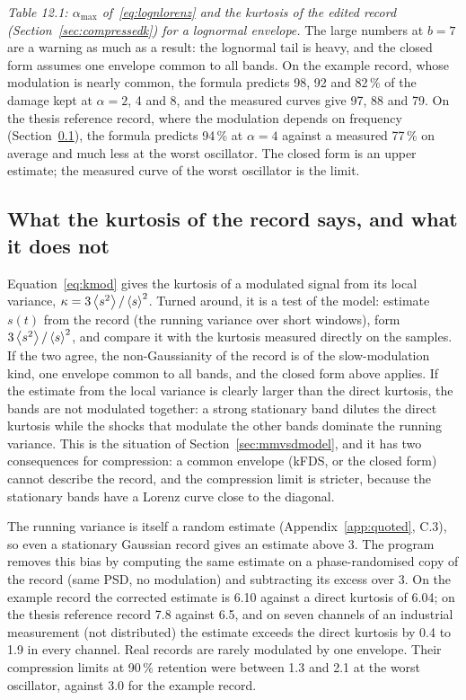 \noindent\emph{Table 12.1: $\alpha_{\max}$ of~\eqref{eq:lognlorenz} and the kurtosis of the edited record
(Section~\ref{sec:compressedk}) for a lognormal envelope.} The large numbers at $b = 7$ are a warning as
much as a result: the lognormal tail is heavy, and the closed form assumes one envelope common to all
bands. On the example record, whose modulation is nearly common, the formula predicts 98, 92 and
82\,\% of the damage kept at $\alpha = 2$, 4 and 8, and the measured curves give 97, 88 and 79. On the
thesis reference record, where the modulation depends on frequency (Section~\ref{sec:mixturekurt}),
the formula predicts 94\,\% at $\alpha = 4$ against a measured 77\,\% on average and much less at the
worst oscillator. The closed form is an upper estimate; the measured curve of the worst oscillator is the
limit.

\subsection{What the kurtosis of the record says, and what it does not}\label{sec:mixturekurt}

Equation~\eqref{eq:kmod} gives the kurtosis of a modulated signal from its local variance,
$\kappa = 3\left\langle s^2 \right\rangle/\left\langle s \right\rangle^2$. Turned around, it is a test of the model: estimate $s(t)$ from the
record (the running variance over short windows), form $3\left\langle s^2 \right\rangle/\left\langle s \right\rangle^2$, and compare it with
the kurtosis measured directly on the samples. If the two agree, the non-Gaussianity of the record is of
the slow-modulation kind, one envelope common to all bands, and the closed form above applies. If the
estimate from the local variance is clearly larger than the direct kurtosis, the bands are not
modulated together: a strong stationary band dilutes the direct kurtosis while the shocks that modulate
the other bands dominate the running variance. This is the situation of Section~\ref{sec:mmvsdmodel},
and it has two consequences for compression: a common envelope (kFDS, or the closed form) cannot
describe the record, and the compression limit is stricter, because the stationary bands have a Lorenz
curve close to the diagonal.

The running variance is itself a random estimate (Appendix~\ref{app:quoted}, C.3), so even a stationary
Gaussian record gives an estimate above 3. The program removes this bias by computing the same estimate
on a phase-randomised copy of the record (same PSD, no modulation) and subtracting its excess over 3.
On the example record the corrected estimate is 6.10 against a direct kurtosis of 6.04; on the thesis
reference record 7.8 against 6.5, and on seven channels of an industrial measurement (not distributed)
the estimate exceeds the direct kurtosis by 0.4 to 1.9 in every channel. Real records are rarely
modulated by one envelope. Their compression limits at 90\,\% retention were between 1.3 and 2.1 at the
worst oscillator, against 3.0 for the example record.
